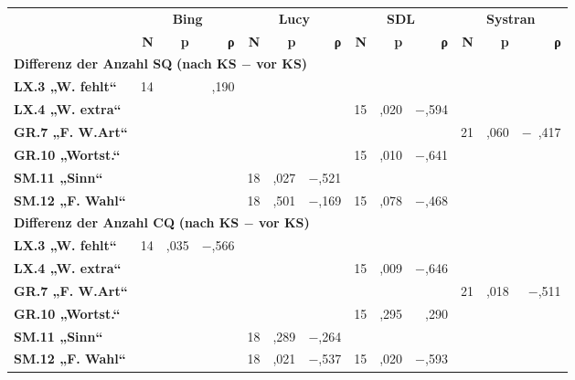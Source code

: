 \begin{sidewaystable}
\scriptsize
\captionsetup{width=\textwidth}
\begin{tabularx}{\textwidth}{Xrrrrrrrrrrrr}

\lsptoprule
 & \multicolumn{3}{c}{\textbf{Bing}} &  \multicolumn{3}{c}{\textbf{Lucy}} & \multicolumn{3}{c}{\textbf{SDL}} & \multicolumn{3}{c}{\textbf{Systran}}\\
 \cmidrule(lr){2-4} \cmidrule(lr){5-7} \cmidrule(lr){8-10} \cmidrule(lr){11-13}
 & {\textbf{N}} & {\textbf{p}} & {\textbf{ρ}} & {\textbf{N}} & \textbf{p} & \textbf{ρ} & \textbf{N} & \textbf{p} & \textbf{ρ} & \textbf{N} & \textbf{p} & \textbf{ρ}\\
 \midrule
\multicolumn{13}{l}{\textbf{Differenz der Anzahl SQ} \textbf{(nach KS $-$ vor KS)}} \\
\textbf{LX.3 „W. fehlt“} & {14} & \cellcolor{lsLightGray}{,516} & {,190} &   &  &  &  &  &  &  &  &\\
\textbf{LX.4 „W. extra“} &  &  & &  &  &  & 15 & ,020 & \cellcolor{smBlue}  {$-$,594} &  &  & \\
\textbf{GR.7 „F. W.Art“} &  & &  &   &  &  &  &  &  & 21 & \cellcolor{lsLightGray} {,060} & $-$~,417\\
\textbf{GR.10 „Wortst.“} &  &  &  &   &  &  & 15 & ,010 & \cellcolor{smBlue} {$-$,641} &  &  & \\
\textbf{SM.11 „Sinn“} &  &  &  &  18 & ,027 & \cellcolor{smBlue} {$-$,521} &  &  &  &  &  & \\
\textbf{SM.12 „F. Wahl“} & &  &  &  18 & \cellcolor{lsLightGray} {,501} & $-$,169 & 15 & \cellcolor{lsLightGray} {,078} & $-$,468 &  &  & \\
\midrule
\multicolumn{13}{l}{\textbf{Differenz der Anzahl CQ} \textbf{(nach KS $-$ vor KS)}}\\
\textbf{LX.3 „W. fehlt“} & {14} & {,035} & \cellcolor{smBlue} {$-$,566} &   &  &  &  &  &  &  &  & \\
\textbf{LX.4 „W. extra“} &  &  &  &   &  &  & 15 & ,009 & \cellcolor{smBlue} {$-$,646} &  &  & \\
\textbf{GR.7 „F. W.Art“} &  &  &   &  &  &  &  &  &  & 21 & ,018 & \cellcolor{smBlue} {$-$,511}\\
\textbf{GR.10 „Wortst.“} &  & &  &   &  &  & 15 & \cellcolor{lsLightGray} {,295} & ,290 &  &  & \\
\textbf{SM.11 „Sinn“} &  &  &  &  18 & \cellcolor{lsLightGray} {,289} & $-$,264 &  &  &  &  &  & \\
\textbf{SM.12 „F. Wahl“} &  &  &  &  18 & ,021 & \cellcolor{smBlue} {$-$,537} & 15 & ,020 & \cellcolor{smBlue} {$-$,593} &  &  & \\

\end{tabularx}
\end{sidewaystable}
